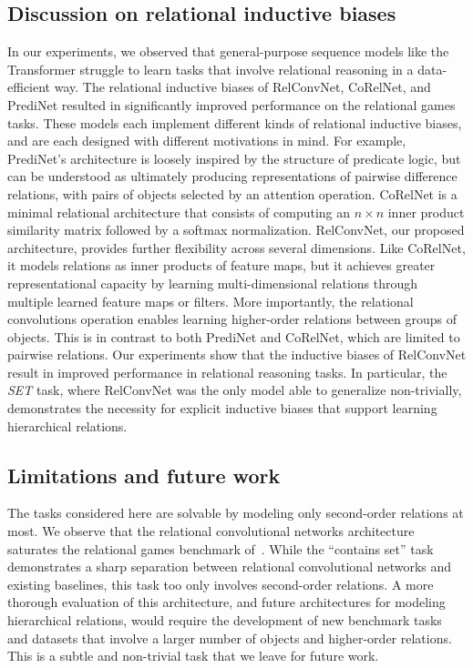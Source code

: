 \subsection*{Discussion on relational inductive biases}
In our experiments, we observed that general-purpose sequence models like the Transformer struggle to learn tasks that involve relational reasoning in a data-efficient way. The relational inductive biases of RelConvNet, CoRelNet, and PrediNet resulted in significantly improved performance on the relational games tasks. These models each implement different kinds of relational inductive biases, and are each designed with different motivations in mind. For example, PrediNet's architecture is loosely inspired by the structure of predicate logic, but can be understood as ultimately producing representations of pairwise difference relations, with pairs of objects selected by an attention operation. CoRelNet is a minimal relational architecture that consists of computing an $n \times n$ inner product similarity matrix followed by a softmax normalization. RelConvNet, our proposed architecture, provides further flexibility across several dimensions. Like CoRelNet, it models relations as inner products of feature maps, but it achieves greater representational capacity by learning multi-dimensional relations through multiple learned feature maps or filters. More importantly, the relational convolutions operation enables learning higher-order relations between groups of objects. This is in contrast to both PrediNet and CoRelNet, which are limited to pairwise relations. Our experiments show that the inductive biases of RelConvNet result in improved performance in relational reasoning tasks. In particular, the \textit{SET} task, where RelConvNet was the only model able to generalize non-trivially, demonstrates the necessity for explicit inductive biases that support learning hierarchical relations.

\subsection*{Limitations and future work}
The tasks considered here are solvable by modeling only second-order relations at most. We observe that the relational convolutional networks architecture saturates the relational games benchmark of~\citet{shanahanExplicitlyRelationalNeural}. While the ``contains set'' task demonstrates a sharp separation between relational convolutional networks and existing baselines, this task too only involves second-order relations.
A more thorough evaluation of this architecture, and future architectures for modeling hierarchical relations, would require the development of new benchmark tasks and datasets that involve a larger number of objects and higher-order relations. This is a subtle and non-trivial task that we leave for future work.

